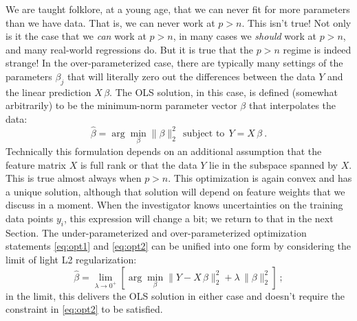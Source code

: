 \documentclass[12pt,letterpaper]{article}
\newcommand{\sectionname}{Section}
\begin{document}
We are taught folklore, at a young age, that we can never fit for more parameters than we have data. That is, we can never work at $p>n$.
This isn't true!
Not only is it the case that we \emph{can} work at $p>n$, in many cases we \emph{should} work at $p>n$, and many real-world regressions do.
But it is true that the $p>n$ regime is indeed strange!
In the over-parameterized case, there are typically many settings of the parameters $\beta_j$ that will literally zero out the differences between the data $Y$ and the linear prediction $X\,\beta$.
The OLS solution, in this case, is defined (somewhat arbitrarily) to be the minimum-norm parameter vector $\beta$ that interpolates the data:
\begin{equation}\label{eq:opt2}
    \hat{\beta} = \arg\min_\beta \|\beta\|_2^2 ~~\mbox{subject to}~~ Y = X\,\beta
    ~.
\end{equation}
Technically this formulation depends on an additional assumption that the feature matrix $X$ is full rank or that the data $Y$ lie in the subspace spanned by $X$.
This is true almost always when $p>n$.
This optimization is again convex and has a unique solution, although that solution will depend on feature weights that we discuss in a moment.
When the investigator knows uncertainties on the training data points $y_i$, this expression will change a bit; we return to that in the next \sectionname.
The under-parameterized and over-parameterized optimization statements \eqref{eq:opt1} and \eqref{eq:opt2} can be unified into one form by considering the limit of light L2 regularization:
\begin{equation}\label{eq:opt3}
    \hat{\beta} = \lim_{\lambda\rightarrow 0^+}\left[\arg\min_\beta \|Y - X\,\beta\|_2^2 + \lambda\,\|\beta\|_2^2\right]
    ~;
\end{equation}
in the limit, this delivers the OLS solution in either case and doesn't require the constraint in \eqref{eq:opt2} to be satisfied.
\end{document}

